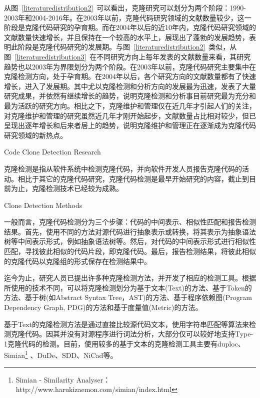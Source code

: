 从图~\ref{literaturedistribution2}~可以看出，克隆研究可以划分为两个阶段：1990-2003年和2004-2016年。在2003年以前，克隆代码研究领域的文献数量较少，这一阶段是克隆代码研究的孕育期。而在2004年以后的近10年内，克隆代码研究领域的文献数量快速增长，并且保持在一个较高的水平上，展现出了蓬勃的发展趋势，表明此阶段是克隆代码研究的发展期。与图~\ref{literaturedistribution2}~类似，从图~\ref{literaturedistribution3}~在不同研究方向上每年发表的文献数量来看，其研究趋势也以2003年为界限划分为两个阶段。在2003年以前，克隆代码研究主要集中在克隆检测方向，处于孕育期。在2004年以后，各个研究方向的文献数量都有了快速增长，进入了发展期。其中尤以克隆检测和分析方向的发展最为迅速，发表了大量研究成果，并依然有继续增长的趋势，说明克隆检测和分析事目前研究最为充分和最为活跃的研究方向。相比之下，克隆维护和管理仅在近几年才引起人们的关注，对克隆维护和管理的研究虽然近几年才刚开始起步，文献数量占比相对较少，但已呈现出逐年增长和后来者居上的趋势，说明克隆维护和管理正在逐渐成为克隆代码研究领域的新热点。

{Code Clone Detection Research}
\label{ref-detection}

克隆检测是指从软件系统中检测克隆代码，并向软件开发人员报告克隆代码的活动。相比于其它的克隆代码研究，克隆代码检测是最早开始研究的内容，截止到目前为止，克隆检测技术已经较为成熟。

{Clone Detection Methods}

一般而言，克隆代码检测分为三个步骤：代码的中间表示、相似性匹配和报告检测结果。首先，使用不同的方法对源代码进行抽象表示或转换，将其表示为抽象语法树等中间表示形式，例如抽象语法树等。然后，对代码的中间表示形式进行相似性匹配，寻找彼此相似的代码片段，即克隆代码。最后，报告检测结果，将彼此相似的克隆代码以克隆组的形式保存在检测结果中。

迄今为止，研究人员已提出许多种克隆检测方法，并开发了相应的检测工具。根据所使用的技术不同，可以将克隆检测划分为基于文本(Text)的方法、基于Token的方法、基于树(如Abstract Syntax Tree，AST)的方法、基于程序依赖图(Program Dependency Graph, PDG)的方法和基于度量值(Metric)的方法。

基于Text的克隆检测方法是通过直接比较源代码文本，使用字符串匹配等算法来检测克隆代码。因其并没有对源程序进行词法分析，大部分仅可以较好地支持Type-1克隆代码的检测。目前，使用较多的基于文本的克隆检测工具主要有duploc\cite{ducasse1999language}、Simian\footnote{Simian - Similarity Analyser：http://www.harukizaemon.com/simian/index.html}%
、DuDe\cite{wettel2005archeology}、SDD\cite{lee2005sdd}、NiCad\cite{roy2008nicad}等。


